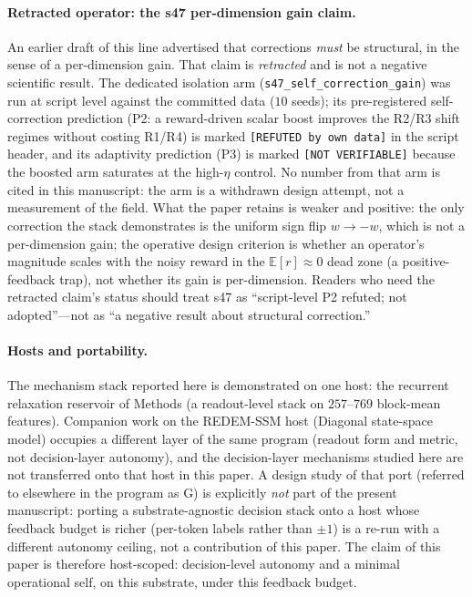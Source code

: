 \documentclass[preprint,12pt]{elsarticle}
\begin{document}
\paragraph{Retracted operator: the s47 per-dimension gain claim.}
An earlier draft of this line advertised that corrections \emph{must} be
structural, in the sense of a per-dimension gain. That claim is
\emph{retracted} and is not a negative scientific result. The dedicated
isolation arm (\texttt{s47\_self\_correction\_gain}) was run at script level
against the committed data ($10$ seeds); its pre-registered self-correction
prediction (P2: a reward-driven scalar boost improves the R2/R3 shift
regimes without costing R1/R4) is marked \texttt{[REFUTED by own data]} in
the script header, and its adaptivity prediction (P3) is marked
\texttt{[NOT VERIFIABLE]} because the boosted arm saturates at the high-$\eta$
control. No number from that arm is cited in this manuscript: the arm is a
withdrawn design attempt, not a measurement of the field. What the paper
retains is weaker and positive: the only correction the stack demonstrates
is the uniform sign flip $w\to-w$, which is not a per-dimension gain; the
operative design criterion is whether an operator's magnitude scales with the
noisy reward in the $\mathbb E[r]\approx0$ dead zone (a positive-feedback
trap), not whether its gain is per-dimension. Readers who need the
retracted claim's status should treat s47 as ``script-level P2 refuted; not
adopted''---not as ``a negative result about structural correction.''

\paragraph{Hosts and portability.}
The mechanism stack reported here is demonstrated on one host: the
recurrent relaxation reservoir of Methods (a readout-level stack on
$257$--$769$ block-mean features). Companion work on the REDEM-SSM host
(Diagonal state-space model) occupies a different layer of the same program
(readout form and metric, not decision-layer autonomy), and the decision-layer
mechanisms studied here are not transferred onto that host in this paper. A
design study of that port (referred to elsewhere in the program as G) is
explicitly \emph{not} part of the present manuscript: porting a
substrate-agnostic decision stack onto a host whose feedback budget is
richer (per-token labels rather than $\pm1$) is a re-run with a different
autonomy ceiling, not a contribution of this paper. The claim of this paper
is therefore host-scoped: decision-level autonomy and a minimal operational
self, on this substrate, under this feedback budget.
\end{document}
